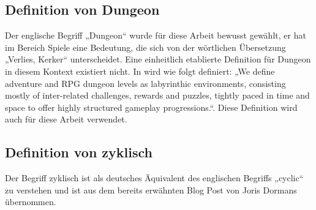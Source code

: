 \subsection{Definition von Dungeon}

Der englische Begriff „Dungeon“ wurde für diese Arbeit bewusst gewählt, er hat im Bereich Spiele eine Bedeutung, die sich von der wörtlichen Übersetzung „Verlies, Kerker“ unterscheidet. Eine einheitlich etablierte Definition für Dungeon in diesem Kontext existiert nicht. In \cite{proceduralGenerationOfDungeons} wird wie folgt definiert: „We define adventure and RPG dungeon levels as labyrinthic environments,  consisting  mostly  of  inter-related  challenges, rewards and puzzles, tightly paced in time and space to offer highly structured gameplay progressions.“. Diese Definition wird auch für diese Arbeit verwendet.








\subsection{Definition von zyklisch}\label{c.weitereskapitel}

Der Begriff zyklisch ist als deutsches Äquivalent des englischen Begriffs „cyclic“ zu verstehen und ist aus dem bereits erwähnten Blog Post von Joris Dormans \cite{blogCyclic} übernommen. 

